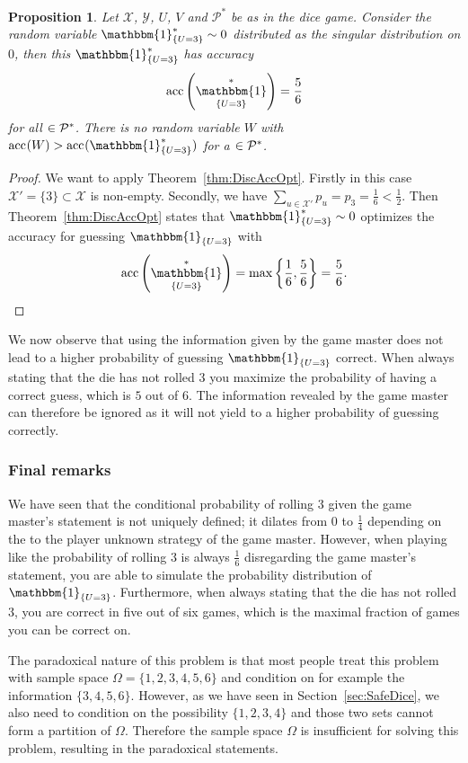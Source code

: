 \documentclass[a4paper]{report}
\theoremstyle{plain}
\newtheorem{proposition}[theorem]{Proposition}
\theoremstyle{definition}
\theoremstyle{remark}
\numberwithin{equation}{chapter}
\let\P\relax
\DeclareMathOperator{\P}{\mathbb{P}}
\DeclareMathOperator{\1}{\mathbbm{1}}
\newcommand{\X}{\mathcal{X}}
\newcommand{\Y}{\mathcal{Y}}
\DeclareMathOperator{\acc}{acc}
\newcommand{\Pmod}{\mathcal{P}^*}
\newcommand{\DieInd}{\1_{\{U=3\}}}
\begin{document}
\begin{proposition}
Let $\X$, $\Y$, $U$, $V$ and $\Pmod$ be as in the dice game. Consider the random variable $\DieInd^*\sim0$ distributed as the singular distribution on $0$, then this $\DieInd^*$ has accuracy
\begin{equation}
\acc^{\P}\left(\DieInd^*\right)=\frac{5}{6}
\end{equation}
for all $\P\in\Pmod$. There is no random variable $W$ with $\acc^{\P}(W)>\acc^{\P}(\DieInd^*)$ for a $\P\in\Pmod$.
\end{proposition}
\begin{proof}
We want to apply Theorem~\ref{thm:DiscAccOpt}. Firstly in this case $\X'=\{3\}\subset\X$ is non-empty. Secondly, we have $\sum_{u\in\X'}p_u=p_3=\frac{1}{6}<\frac{1}{2}$. Then Theorem~\ref{thm:DiscAccOpt} states that $\DieInd^*\sim0$ optimizes the accuracy for guessing $\DieInd$ with
\begin{equation}
\acc\left(\DieInd^*\right)=\max\left\{\frac{1}{6},\frac{5}{6}\right\}=\frac{5}{6}.
\end{equation}
\end{proof}

We now observe that using the information given by the game master does not lead to a higher probability of guessing $\DieInd$ correct. When always stating that the die has not rolled $3$ you maximize the probability of having a correct guess, which is $5$ out of $6$. The information revealed by the game master can therefore be ignored as it will not yield to a higher probability of guessing correctly.

\subsubsection{Final remarks}
We have seen that the conditional probability of rolling $3$ given the game master's statement is not uniquely defined; it dilates from $0$ to $\frac{1}{4}$ depending on the to the player unknown strategy of the game master. However, when playing like the probability of rolling $3$ is always $\frac{1}{6}$ disregarding the game master's statement, you are able to simulate the probability distribution of $\DieInd$. Furthermore, when always stating that the die has not rolled $3$, you are correct in five out of six games, which is the maximal fraction of games you can be correct on.

The paradoxical nature of this problem is that most people treat this problem with sample space $\Omega=\{1,2,3,4,5,6\}$ and condition on for example the information $\{3,4,5,6\}$. However, as we have seen in Section~\ref{sec:SafeDice}, we also need to condition on the possibility $\{1,2,3,4\}$ and those two sets cannot form a partition of $\Omega$. Therefore the sample space $\Omega$ is insufficient for solving this problem, resulting in the paradoxical statements.
\end{document}

